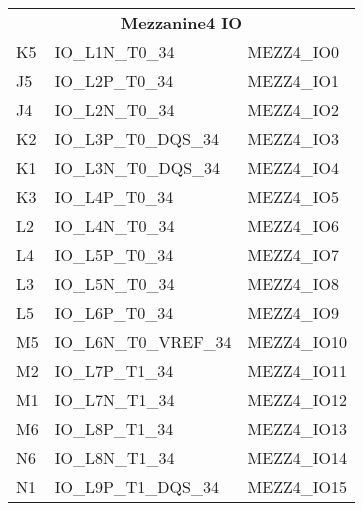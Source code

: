 \begin{footnotesize}
	\begin{longtable}{|l|p{6cm}|p{6cm}|}
		\hline
		\multicolumn{3}{|c|}{\multirow{2}{*}{\textbf{\large{Mezzanine4 IO}}}}\\
		\multicolumn{3}{|c|}{} \\ \hline 
K5	&	IO\_L1N\_T0\_34	&	MEZZ4\_IO0	\\ \hline
J5	&	IO\_L2P\_T0\_34	&	MEZZ4\_IO1	\\ \hline
J4	&	IO\_L2N\_T0\_34	&	MEZZ4\_IO2	\\ \hline
K2	&	IO\_L3P\_T0\_DQS\_34	&	MEZZ4\_IO3	\\ \hline
K1	&	IO\_L3N\_T0\_DQS\_34	&	MEZZ4\_IO4	\\ \hline
K3	&	IO\_L4P\_T0\_34	&	MEZZ4\_IO5	\\ \hline
L2	&	IO\_L4N\_T0\_34	&	MEZZ4\_IO6	\\ \hline
L4	&	IO\_L5P\_T0\_34	&	MEZZ4\_IO7	\\ \hline
L3	&	IO\_L5N\_T0\_34	&	MEZZ4\_IO8	\\ \hline
L5	&	IO\_L6P\_T0\_34	&	MEZZ4\_IO9	\\ \hline
M5	&	IO\_L6N\_T0\_VREF\_34	&	MEZZ4\_IO10	\\ \hline
M2	&	IO\_L7P\_T1\_34	&	MEZZ4\_IO11	\\ \hline
M1	&	IO\_L7N\_T1\_34	&	MEZZ4\_IO12	\\ \hline
M6	&	IO\_L8P\_T1\_34	&	MEZZ4\_IO13	\\ \hline
N6	&	IO\_L8N\_T1\_34	&	MEZZ4\_IO14	\\ \hline
N1	&	IO\_L9P\_T1\_DQS\_34	&	MEZZ4\_IO15	\\ \hline

		
	\end{longtable}
\end{footnotesize}



